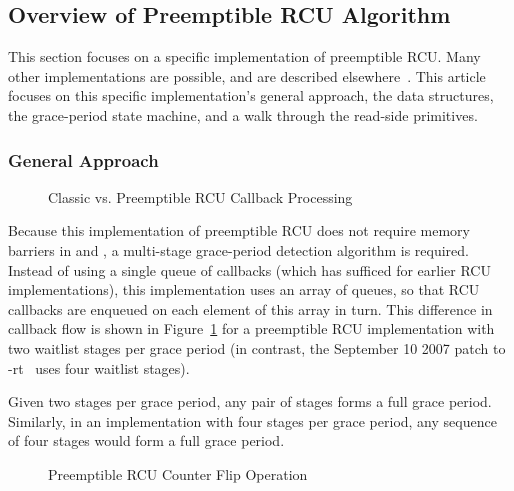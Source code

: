 \subsection{Overview of Preemptible RCU Algorithm}
\label{app:rcuimpl:Overview of Preemptible RCU Algorithm}

This section focuses on a specific implementation of preemptible RCU.
Many other implementations are possible, and are described
elsewhere~\cite{PaulEMcKenney2006b,PaulMcKenney05b}.
This article focuses on this specific implementation's
general approach, the data structures,
the grace-period state machine, and a walk through the read-side primitives.

\subsubsection{General Approach}
\label{app:rcuimpl:General Approach}

\begin{figure}[htb]
\centering
{}
\caption{Classic vs. Preemptible RCU Callback Processing}
\label{app:rcuimpl:Classic vs. Preemptible RCU Callback Processing}
\end{figure}

Because this implementation of preemptible RCU does not require memory
barriers in  and ,
a multi-stage grace-period detection algorithm is required.
Instead of using a single  queue of callbacks
(which has sufficed for earlier RCU implementations), this implementation
uses an array of  queues, so that RCU callbacks
are enqueued on each element of this array in turn.
This difference in callback flow is shown in
Figure~\ref{app:rcuimpl:Classic vs. Preemptible RCU Callback Processing}
for a preemptible RCU implementation with two waitlist stages per grace period
(in contrast,
the September 10 2007 patch to -rt~\cite{PaulEMcKenney2007PreemptibleRCUPatch}
uses four waitlist stages).

Given two stages per grace period, any pair of
stages forms a full grace period.
Similarly, in an implementation with four stages per grace period,
any sequence of four stages would form a full grace period.

\begin{figure}[htb]
\centering
{}
\caption{Preemptible RCU Counter Flip Operation}
\label{app:rcuimpl:Preemptible RCU Counter Flip Operation}
\end{figure}

